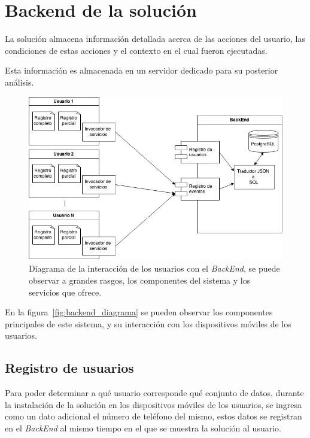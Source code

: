 \section{Backend de la solución}

La solución almacena información detallada acerca de las acciones del usuario,
las condiciones de estas acciones y el contexto en el cual fueron ejecutadas.

Esta información es almacenada en un servidor dedicado para su posterior
análisis.

\begin{figure}[ht]
\centering
\includegraphics[scale=0.5]{propuesta/images/backend_diagrama.png}
\caption{Diagrama de la interacción de los usuarios con el \textit{BackEnd}, se
    puede observar a grandes rasgos, los componentes del sistema y los servicios
    que ofrece.}
\label{fig:backend_diagrama2}
\end{figure}

En la figura~\ref{fig:backend_diagrama} se pueden observar los componentes
principales de este sistema, y su interacción con los dispositivos móviles de
los usuarios. 

\subsection{Registro de usuarios}

Para poder determinar a qué usuario corresponde qué conjunto de datos, durante la
instalación de la solución en los dispositivos móviles de los usuarios, se ingresa como
un dato adicional el número de teléfono del mismo, estos datos se registran
en el \textit{BackEnd} al mismo tiempo en el que se muestra la solución al usuario.

